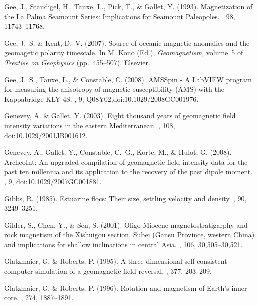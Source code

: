 \documentclass[11pt]{book}
\begin{document}
\begin{thebibliography}{}
Gee, J., Staudigel, H., Tauxe, L., Pick, T., \& Gallet, Y. (1993).
\newblock Magnetization of the La Palma Seamount Series: Implications for
  Seamount Paleopoles.
, 98, 11743--11768.

Gee, J.~S. \& Kent, D.~V. (2007).
\newblock Source of oceanic magnetic anomalies and the geomagetic polarity
  timescale.
\newblock In M. Kono (Ed.), {\em Geomagnetism}, volume~5 of {\em Treatise on
  Geophysics}  (pp.\ 455--507). Elsevier.

Gee, J.~S., Tauxe, L., \& Constable, C. (2008).
\newblock AMSSpin - A LabVIEW program for measuring the anisotropy of magnetic
  susceptibility (AMS) with the Kappabridge KLY-4S.
, 9, Q08Y02,doi:10.1029/2008GC001976.

Genevey, A. \& Gallet, Y. (2003).
\newblock Eight thousand years of geomagnetic field intensity variations in the
  eastern Mediterranean.
, 108, doi:10.1029/2001JB001612.

Genevey, A., Gallet, Y., Constable, C.~G., Korte, M., \& Hulot, G. (2008).
\newblock ArcheoInt: An upgraded compilation of geomagnetic field intensity
  data for the past ten millennia and its application to the recovery of the
  past dipole moment.
, 9, doi:10.1029/2007GC001881.

Gibbs, R. (1985).
\newblock Estuarine flocs: Their size, settling velocity and density.
, 90, 3249--3251.

Gilder, S., Chen, Y., \& Sen, S. (2001).
\newblock Oligo-Miocene magnetostratigarphy and rock magnetism of the Xishuigou
  section, Subei (Gansu Province, western China) and implications for shallow
  inclinations in central Asia.
, 106, 30,505--30,521.

Glatzmaier, G. \& Roberts, P. (1995).
\newblock A three-dimensional self-consistent computer simulation of a
  geomagnetic field reversal.
, 377, 203--209.

Glatzmaier, G. \& Roberts, P. (1996).
\newblock Rotation and magnetism of Earth's inner core.
, 274, 1887--1891.


\end{thebibliography}
\end{document}
